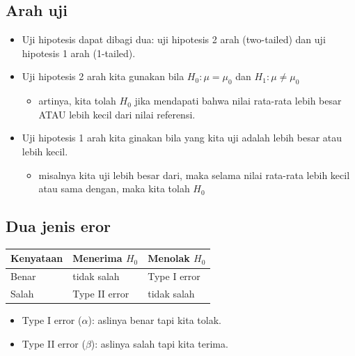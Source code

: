 \documentclass[
  letterpaper,
  DIV=11,
  numbers=noendperiod]{scrartcl}
\providecommand{\tightlist}{%
  \setlength{\itemsep}{0pt}\setlength{\parskip}{0pt}}\usepackage{longtable,booktabs,array}
\begin{document}
\subsection{Arah uji}\label{arah-uji}

\begin{itemize}
\item
  Uji hipotesis dapat dibagi dua: uji hipotesis 2 arah (two-tailed) dan
  uji hipotesis 1 arah (1-tailed).
\item
  Uji hipotesis 2 arah kita gunakan bila \(H_0: \mu=\mu_0\) dan
  \(H_1: \mu\neq\mu_0\)

  \begin{itemize}
  \tightlist
  \item
    artinya, kita tolah \(H_0\) jika mendapati bahwa nilai rata-rata
    lebih besar ATAU lebih kecil dari nilai referensi.
  \end{itemize}
\item
  Uji hipotesis 1 arah kita ginakan bila yang kita uji adalah lebih
  besar atau lebih kecil.

  \begin{itemize}
  \tightlist
  \item
    misalnya kita uji lebih besar dari, maka selama nilai rata-rata
    lebih kecil atau sama dengan, maka kita tolah \(H_0\)
  \end{itemize}
\end{itemize}

\subsection{Dua jenis eror}\label{dua-jenis-eror}

\begin{longtable}[]{@{}lll@{}}
\toprule\noalign{}
Kenyataan & Menerima \(H_0\) & Menolak \(H_0\) \\
\midrule\noalign{}
\endhead
\bottomrule\noalign{}
\endlastfoot
Benar & tidak salah & Type I error \\
Salah & Type II error & tidak salah \\
\end{longtable}

\begin{itemize}
\item
  Type I error (\(\alpha\)): aslinya benar tapi kita tolak.
\item
  Type II error (\(\beta\)): aslinya salah tapi kita terima.
\end{itemize}
\end{document}
